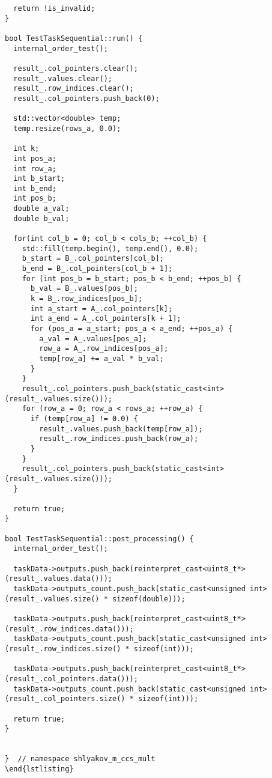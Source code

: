 \documentclass[12pt]{article}
\begin{document}
\begin{verbatim}
  return !is_invalid;
}

bool TestTaskSequential::run() {
  internal_order_test();

  result_.col_pointers.clear();
  result_.values.clear();
  result_.row_indices.clear();
  result_.col_pointers.push_back(0);

  std::vector<double> temp;
  temp.resize(rows_a, 0.0);

  int k;
  int pos_a;
  int row_a;
  int b_start;
  int b_end;
  int pos_b;
  double a_val;
  double b_val;

  for(int col_b = 0; col_b < cols_b; ++col_b) {
    std::fill(temp.begin(), temp.end(), 0.0);
    b_start = B_.col_pointers[col_b];
    b_end = B_.col_pointers[col_b + 1];
    for (int pos_b = b_start; pos_b < b_end; ++pos_b) {
      b_val = B_.values[pos_b];
      k = B_.row_indices[pos_b];
      int a_start = A_.col_pointers[k];
      int a_end = A_.col_pointers[k + 1];
      for (pos_a = a_start; pos_a < a_end; ++pos_a) {
        a_val = A_.values[pos_a];
        row_a = A_.row_indices[pos_a];
        temp[row_a] += a_val * b_val;
      }
    }
    result_.col_pointers.push_back(static_cast<int>(result_.values.size()));
    for (row_a = 0; row_a < rows_a; ++row_a) {
      if (temp[row_a] != 0.0) {
        result_.values.push_back(temp[row_a]);
        result_.row_indices.push_back(row_a);
      }
    }
    result_.col_pointers.push_back(static_cast<int>(result_.values.size()));
  }

  return true;
}

bool TestTaskSequential::post_processing() {
  internal_order_test();

  taskData->outputs.push_back(reinterpret_cast<uint8_t*>(result_.values.data()));
  taskData->outputs_count.push_back(static_cast<unsigned int>(result_.values.size() * sizeof(double)));

  taskData->outputs.push_back(reinterpret_cast<uint8_t*>(result_.row_indices.data()));
  taskData->outputs_count.push_back(static_cast<unsigned int>(result_.row_indices.size() * sizeof(int)));

  taskData->outputs.push_back(reinterpret_cast<uint8_t*>(result_.col_pointers.data()));
  taskData->outputs_count.push_back(static_cast<unsigned int>(result_.col_pointers.size() * sizeof(int)));

  return true;
}


}  // namespace shlyakov_m_ccs_mult
\end{lstlisting}
\end{verbatim}
\end{document}
